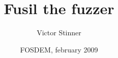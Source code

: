 {
}
\usepackage[utf8]{inputenc}
\usepackage{times}
\usepackage{graphicx}
\usepackage[T1]{fontenc}

\title{Fusil the fuzzer}

\author{Victor Stinner}

\date{FOSDEM, february 2009}

\beamerdefaultoverlayspecification{<+->}


